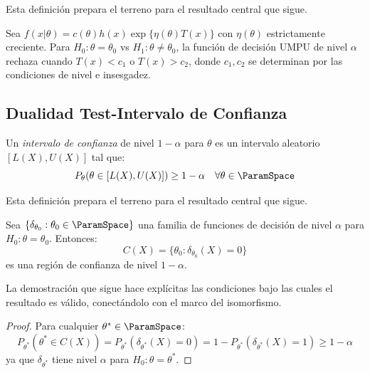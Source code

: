 Esta definición prepara el terreno para el resultado central que sigue.

\begin{theorem}
	\label{thm:ch4-umpu}
	Sea $f(x|\theta) = c(\theta) h(x) \exp\{\eta(\theta) T(x)\}$ con $\eta(\theta)$
	estrictamente creciente. Para $H_0: \theta = \theta_0$ vs $H_1: \theta \neq \theta_0$,
	la función de decisión UMPU de nivel $\alpha$ rechaza cuando $T(x) < c_1$ o $T(x) > c_2$,
	donde $c_1, c_2$ se determinan por las condiciones de nivel e insesgadez.
\end{theorem}

\subsection{Dualidad Test-Intervalo de Confianza}
\label{sec:ch4-dualidad}

\begin{definition}
	\label{def:ch4-ic}
	Un \emph{intervalo de confianza} de nivel $1-\alpha$ para $\theta$ es un
	intervalo aleatorio $[L(X), U(X)]$ tal que:
	\[
		P_\theta(\theta \in [L(X), U(X)]) \geq 1 - \alpha \quad \forall \theta \in \ParamSpace
	\]
\end{definition}

Esta definición prepara el terreno para el resultado central que sigue.

\begin{theorem}
	\label{thm:ch4-inversion}
	Sea $\{\delta_{\theta_0} : \theta_0 \in \ParamSpace\}$ una familia de funciones
	de decisión de nivel $\alpha$ para $H_0: \theta = \theta_0$. Entonces:
	\[
		C(X) = \{\theta_0 : \delta_{\theta_0}(X) = 0\}
	\]
	es una región de confianza de nivel $1-\alpha$.
\end{theorem}

La demostración que sigue hace explícitas las condiciones bajo las cuales
el resultado es válido, conectándolo con el marco del isomorfismo.

\begin{proof}
	Para cualquier $\theta^* \in \ParamSpace$:
	\[
		P_{\theta^*}(\theta^* \in C(X)) = P_{\theta^*}(\delta_{\theta^*}(X) = 0)
		= 1 - P_{\theta^*}(\delta_{\theta^*}(X) = 1) \geq 1 - \alpha
	\]
	ya que $\delta_{\theta^*}$ tiene nivel $\alpha$ para $H_0: \theta = \theta^*$.
\end{proof}

